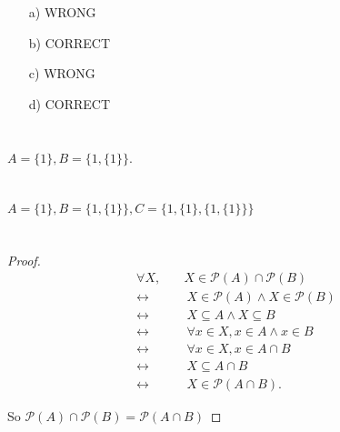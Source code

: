 \documentclass{article}
\newcommand{\PP}{\mathcal{P}}
\begin{document}
\section{}

\begin{itemize}
    \item [a)] WRONG
    \item [b)] CORRECT
    \item [c)] WRONG
    \item [d)] CORRECT
\end{itemize}

\section{}

$A = \{1\}, B = \{1, \{1\}\}$.

\section{}

$A = \{1\}, B = \{1, \{1\}\}, C = \{1, \{1\}, \{1, \{1\}\}\}$

\section{}

\begin{proof}
    \begin{align*}
        \forall X,\quad &X \in \PP(A) \cap \PP(B) \\
        \leftrightarrow &\ X \in \PP(A) \land X \in \PP(B) \\
        \leftrightarrow &\ X \subseteq A \land X \subseteq B \\
        \leftrightarrow &\ \forall x \in X, x \in A \land x \in B \\
        \leftrightarrow &\ \forall x \in X, x \in A \cap B \\
        \leftrightarrow &\ X \subseteq A \cap B \\
        \leftrightarrow &\ X \in \PP(A \cap B).
    \end{align*}

    So $\PP(A) \cap \PP(B) = \PP(A \cap B)$
\end{proof}

\subsection{}
\end{document}
